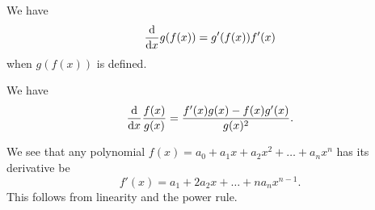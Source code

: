 \begin{definition}
\begin{node}\label{calculus-000U}%
We have
\[\frac{\mathrm{d}}{\mathrm{d} x}g(f(x))=g'(f(x))f'(x)\]
when $g(f(x))$ is defined.
\end{node}

\begin{corollary}\label{calculus-000V}%
We have
\[\frac{\mathrm{d}}{\mathrm{d} x}\frac{f(x)}{g(x)}=\frac{f'(x)g(x)-f(x)g'(x)}{g(x)^{2}}.\]
\end{corollary}

\begin{example}\label{calculus-000C}%
We see that any polynomial
$f(x)=a_{0}+a_{1}x+a_{2}x^{2}+\dots+a_{n}x^{n}$ has its derivative be
\begin{equation*}
f'(x) = a_{1} + 2a_{2}x+\dots+na_{n}x^{n-1}.
\end{equation*}
This follows from linearity and the power rule.
\end{example}
\end{definition}


